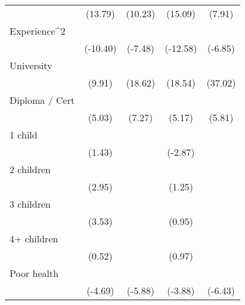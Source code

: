 {\begin{tabular}{l*{4}{c}}
                    &     (13.79)         &     (10.23)         &     (15.09)         &      (7.91)         \\
[1em]
Experience^{2}      &            \sym{***}&            \sym{***}&            \sym{***}&            \sym{***}\\
                    &    (-10.40)         &     (-7.48)         &    (-12.58)         &     (-6.85)         \\
[1em]
University          &            \sym{***}&            \sym{***}&            \sym{***}&            \sym{***}\\
                    &      (9.91)         &     (18.62)         &     (18.54)         &     (37.02)         \\
[1em]
Diploma / Cert      &            \sym{***}&            \sym{***}&            \sym{***}&            \sym{***}\\
                    &      (5.03)         &      (7.27)         &      (5.17)         &      (5.81)         \\
[1em]
1 child             &                     &                     &            \sym{**} &                     \\
                    &      (1.43)         &                     &     (-2.87)         &                     \\
[1em]
2 children          &            \sym{**} &                     &                     &                     \\
                    &      (2.95)         &                     &      (1.25)         &                     \\
[1em]
3 children          &            \sym{***}&                     &                     &                     \\
                    &      (3.53)         &                     &      (0.95)         &                     \\
[1em]
4+ children         &                     &                     &                     &                     \\
                    &      (0.52)         &                     &      (0.97)         &                     \\
[1em]
Poor health         &            \sym{***}&            \sym{***}&            \sym{***}&            \sym{***}\\
                    &     (-4.69)         &     (-5.88)         &     (-3.88)         &     (-6.43)         \\

\end{tabular}}

